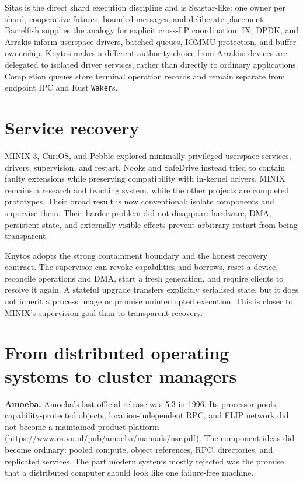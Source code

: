 Sitas is the direct shard execution discipline and is Seastar-like: one owner
per shard, cooperative futures, bounded messages, and deliberate placement.
Barrelfish supplies the analogy for explicit cross-LP coordination. IX, DPDK,
and Arrakis inform userspace drivers, batched queues, IOMMU protection, and
buffer ownership. Knytos makes a different authority choice from Arrakis:
devices are delegated to isolated driver services, rather than directly to ordinary
applications. Completion queues store terminal operation records and remain
separate from endpoint IPC and Rust \texttt{Waker}s.

\section{Service recovery}

MINIX 3, CuriOS, and Pebble explored minimally privileged userspace services,
drivers, supervision, and restart. Nooks and SafeDrive instead tried to
contain faulty extensions while preserving compatibility with in-kernel
drivers. MINIX remains a research and teaching system, while the other projects are
completed prototypes. Their broad result is now conventional: isolate components
and supervise them. Their harder problem did not disappear: hardware,
DMA, persistent state, and externally visible effects prevent arbitrary
restart from being transparent.

Knytos adopts the strong containment boundary and the honest recovery
contract. The supervisor can revoke capabilities and borrows, reset a device,
reconcile operations and DMA, start a fresh generation, and require clients to
resolve it again. A stateful upgrade transfers explicitly serialised state, but
it does not inherit a process image or promise uninterrupted execution. This
is closer to MINIX's supervision goal than to transparent recovery.

\section{From distributed operating systems to cluster managers}

\textbf{Amoeba.} Amoeba's last official release was 5.3 in 1996. Its processor
pools, capability-protected objects, location-independent RPC, and FLIP network
did not become a maintained product platform
(\url{https://www.cs.vu.nl/pub/amoeba/manuals/usr.pdf}). The component ideas
did become ordinary: pooled compute, object references, RPC, directories, and
replicated services. The part modern systems mostly rejected was the promise
that a distributed computer should look like one failure-free machine.

